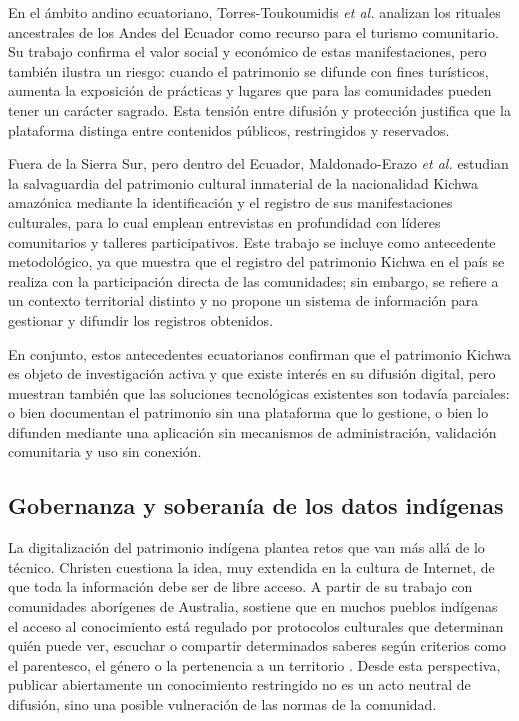 En el ámbito andino ecuatoriano, Torres-Toukoumidis \textit{et al.} \cite{torres2022ancestral} analizan los rituales ancestrales de los Andes del Ecuador como recurso para el turismo comunitario. Su trabajo confirma el valor social y económico de estas manifestaciones, pero también ilustra un riesgo: cuando el patrimonio se difunde con fines turísticos, aumenta la exposición de prácticas y lugares que para las comunidades pueden tener un carácter sagrado. Esta tensión entre difusión y protección justifica que la plataforma distinga entre contenidos públicos, restringidos y reservados.

Fuera de la Sierra Sur, pero dentro del Ecuador, Maldonado-Erazo \textit{et al.} \cite{maldonado2021kichwa} estudian la salvaguardia del patrimonio cultural inmaterial de la nacionalidad Kichwa amazónica mediante la identificación y el registro de sus manifestaciones culturales, para lo cual emplean entrevistas en profundidad con líderes comunitarios y talleres participativos. Este trabajo se incluye como antecedente metodológico, ya que muestra que el registro del patrimonio Kichwa en el país se realiza con la participación directa de las comunidades; sin embargo, se refiere a un contexto territorial distinto y no propone un sistema de información para gestionar y difundir los registros obtenidos.

En conjunto, estos antecedentes ecuatorianos confirman que el patrimonio Kichwa es objeto de investigación activa y que existe interés en su difusión digital, pero muestran también que las soluciones tecnológicas existentes son todavía parciales: o bien documentan el patrimonio sin una plataforma que lo gestione, o bien lo difunden mediante una aplicación sin mecanismos de administración, validación comunitaria y uso sin conexión.

\subsection{Gobernanza y soberanía de los datos indígenas}
La digitalización del patrimonio indígena plantea retos que van más allá de lo técnico. Christen \cite{christen2012information} cuestiona la idea, muy extendida en la cultura de Internet, de que toda la información debe ser de libre acceso. A partir de su trabajo con comunidades aborígenes de Australia, sostiene que en muchos pueblos indígenas el acceso al conocimiento está regulado por protocolos culturales que determinan quién puede ver, escuchar o compartir determinados saberes según criterios como el parentesco, el género o la pertenencia a un territorio \cite{christen2012information,christen2017mukurtu}. Desde esta perspectiva, publicar abiertamente un conocimiento restringido no es un acto neutral de difusión, sino una posible vulneración de las normas de la comunidad.


